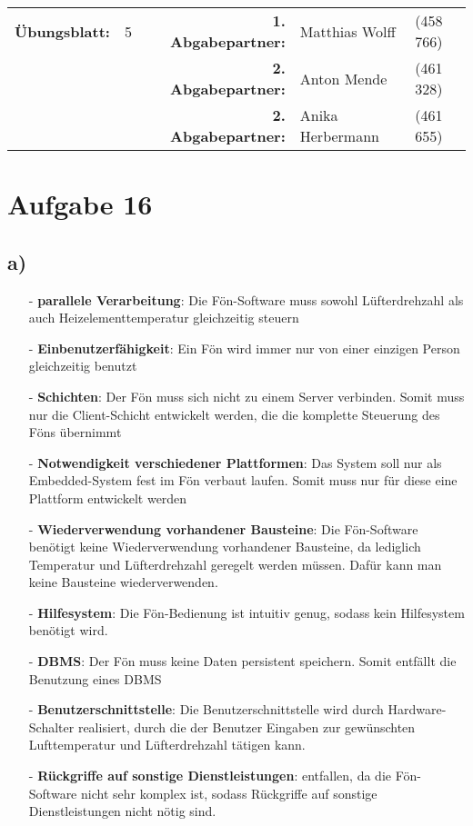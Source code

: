 \newcommand{\obenlinks}{Software Engineering}		%



	\begin{center}
		\begin{tabular}{|rlp{4cm}rll|}
		\hline
		 \textbf{Übungsblatt:} & 5 &   & \textbf{1. Abgabepartner:} & Matthias Wolff & (458 766)  \\
		        & & & \textbf{2. Abgabepartner:} & Anton Mende & (461 328) \\
		        & & & \textbf{2. Abgabepartner:} & Anika Herbermann & (461 655) \\ \hline
		\end{tabular}
	\end{center}
\section*{Aufgabe 16}
\subsection*{a)}
\begin{itemize}
\item[-] \textbf{parallele Verarbeitung}: Die Fön-Software muss sowohl Lüfterdrehzahl als auch Heizelementtemperatur gleichzeitig steuern\\
\item[-] \textbf{Einbenutzerfähigkeit}: Ein Fön wird immer nur von einer einzigen Person gleichzeitig benutzt\\
\item[-] \textbf{Schichten}: Der Fön muss sich nicht zu einem Server verbinden. Somit muss nur die Client-Schicht entwickelt werden, die die komplette Steuerung des Föns übernimmt\\
\item[-] \textbf{Notwendigkeit verschiedener Plattformen}: Das System soll nur als Embedded-System fest im Fön verbaut laufen. Somit muss nur für diese eine Plattform entwickelt werden
\item[-] \textbf{Wiederverwendung vorhandener Bausteine}: Die Fön-Software benötigt keine Wiederverwendung vorhandener Bausteine, da lediglich Temperatur und Lüfterdrehzahl geregelt werden müssen. Dafür kann man keine Bausteine wiederverwenden.\\
\item[-] \textbf{Hilfesystem}: Die Fön-Bedienung ist intuitiv genug, sodass kein Hilfesystem benötigt wird.
\item[-] \textbf{DBMS}: Der Fön muss keine Daten persistent speichern. Somit entfällt die Benutzung eines DBMS\\
\item[-] \textbf{Benutzerschnittstelle}: Die Benutzerschnittstelle wird durch Hardware-Schalter realisiert, durch die der Benutzer Eingaben zur gewünschten Lufttemperatur und Lüfterdrehzahl tätigen kann.\\
\item[-] \textbf{Rückgriffe auf sonstige Dienstleistungen}: entfallen, da die Fön-Software nicht sehr komplex ist, sodass Rückgriffe auf sonstige Dienstleistungen nicht nötig sind.\\
\end{itemize}
\newpage
